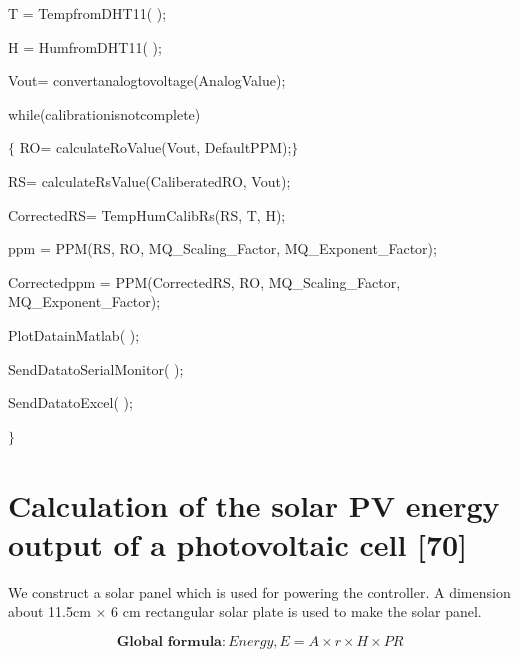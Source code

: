 T = TempfromDHT11( );\par

H = HumfromDHT11( );\par

Vout= convertanalogtovoltage(AnalogValue);\par

while(calibrationisnotcomplete)\par

$ \{ $  RO= calculateRoValue(Vout, DefaultPPM);$ \} $ \par

RS= calculateRsValue(CaliberatedRO, Vout);\par

CorrectedRS= TempHumCalibRs(RS, T, H);\par

ppm = PPM(RS, RO, MQ\_Scaling\_Factor, MQ\_Exponent\_Factor); \par

Correctedppm = PPM(CorrectedRS, RO, MQ\_Scaling\_Factor, MQ\_Exponent\_Factor);\par

PlotDatainMatlab( );\par

SendDatatoSerialMonitor( );\par

SendDatatoExcel( );\par

$ \} $ \par

\setlength{\parskip}{8.04pt}
\section{Calculation of the solar PV energy output of a photovoltaic cell [70]}
\begin{justify}
We construct a solar panel which is used for powering the controller. A dimension about 11.5cm \(   \times  \)  6 cm rectangular solar plate is used to make the solar panel.
\end{justify}\par




%
%
 \begin{equation}\tag{5.9}
\textbf{Global formula}:Energy,E=A \times r \times H \times PR
\end{equation}


